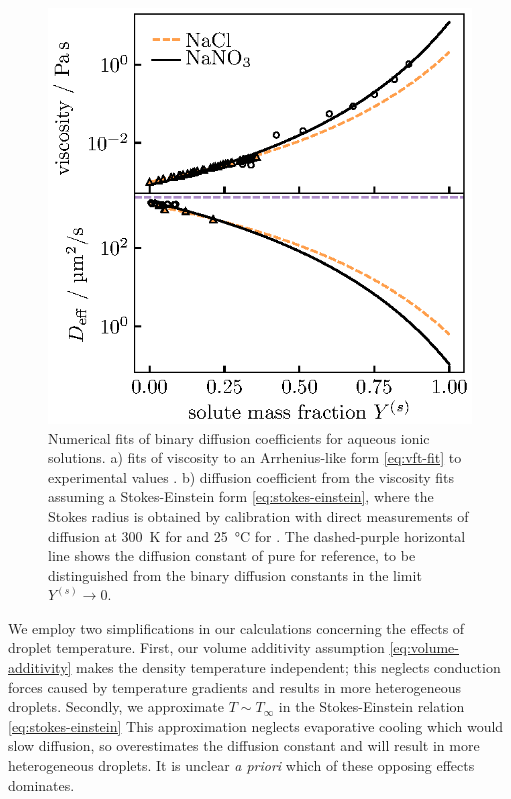 \documentclass[11pt,twoside]{report}
\begin{document}
\begin{figure}
  \includegraphics[width=0.9\linewidth,outer]{aerosol-diffusion-fit}
  \caption[Viscosity and diffusion coefficients of aqueous ionic solutions]{
    Numerical fits of binary diffusion coefficients for aqueous ionic solutions.
    a) fits of viscosity to an Arrhenius-like form \eqref{eq:vft-fit} to experimental values \cite{?,PowerCS2013}.
    b) diffusion coefficient from the viscosity fits assuming a Stokes-Einstein form \eqref{eq:stokes-einstein}, where the Stokes radius is obtained by calibration with direct measurements of diffusion at \SI{300}{\kelvin} for  \cite{LyubartsevJPC1996} and \SI{25}{\celsius} for  \cite{YehJCED1970}.
    The dashed-purple horizontal line shows the diffusion constant of pure  for reference, to be distinguished from the binary diffusion constants in the limit $Y^{(s)} \to 0$.}
  \label{fig:diffusion-fit}
\end{figure}

We employ two simplifications in our calculations concerning the effects of droplet temperature.
First, our volume additivity assumption \eqref{eq:volume-additivity} makes the density temperature independent; this neglects conduction forces caused by temperature gradients and results in more heterogeneous droplets.
Secondly, we approximate $T \sim T_\infty$ in the Stokes-Einstein relation \eqref{eq:stokes-einstein}
This approximation neglects evaporative cooling which would slow diffusion, so overestimates the diffusion constant and will result in more heterogeneous droplets.
It is unclear \emph{a priori} which of these opposing effects dominates.
\end{document}
